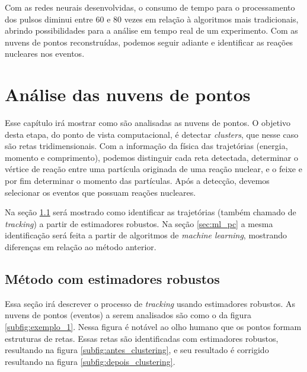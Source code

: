 \documentclass[a4paper,12pt,oneside]{book}
\begin{document}
\par Com as redes neurais desenvolvidas, o consumo de tempo para o processamento dos pulsos diminui entre 60 e 80 vezes em relação à algoritmos mais tradicionais, abrindo possibilidades para a análise em tempo real de um experimento. Com as nuvens de pontos reconstruídas, podemos seguir adiante e identificar as reações nucleares nos eventos.

\chapter{Análise das nuvens de pontos}

\par Esse capítulo irá mostrar como são analisadas as nuvens de pontos. O objetivo desta etapa, do ponto de vista computacional, é detectar \textit{clusters}, que nesse caso são retas tridimensionais. Com a informação da física das trajetórias (energia, momento e  comprimento), podemos distinguir cada reta detectada, determinar o vértice de reação entre uma partícula originada de uma reação nuclear, e o feixe e por fim determinar o momento das partículas. Após a detecção, devemos selecionar os eventos que possuam reações nucleares.

\par Na seção \ref{sec:forcabruta} será mostrado como identificar as trajetórias (também chamado de \textit{tracking}) a partir de estimadores robustos. Na seção \ref{sec:ml_pc} a mesma identificação será feita a partir de algoritmos de \textit{machine learning}, mostrando diferenças em relação ao método anterior.


\section{Método com estimadores robustos}\label{sec:forcabruta}

\par Essa seção irá descrever o processo de \textit{tracking} usando estimadores robustos. As nuvens de pontos (eventos) a serem analisados são como o da figura \ref{subfig:exemplo_1}. Nessa figura é notável ao olho humano que os pontos formam estruturas de retas. Essas retas são identificadas com estimadores robustos\cite{artigo}, resultando na figura \ref{subfig:antes_clustering}, e seu resultado é corrigido resultando na figura \ref{subfig:depois_clustering}. 
\end{document}
